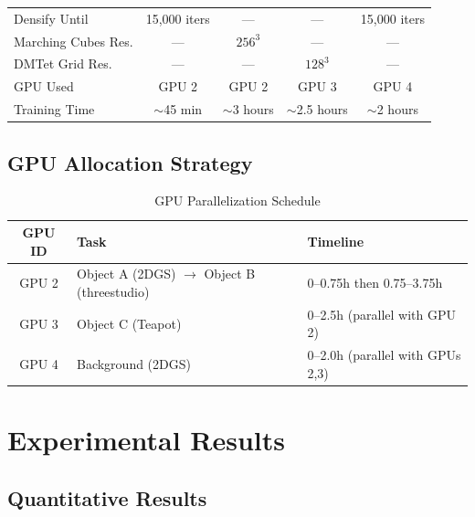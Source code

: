 \documentclass{article}
\begin{document}
\begin{table}[H]
\begin{tabular}{@{}lcccc@{}}
Densify Until       & 15,000 iters          & ---                    & ---                         & 15,000 iters \\
Marching Cubes Res. & ---                   & $256^3$                & ---                         & --- \\
DMTet Grid Res.     & ---                   & ---                    & $128^3$                     & --- \\
GPU Used            & GPU 2                 & GPU 2                  & GPU 3                       & GPU 4 \\
Training Time       & $\sim$45 min          & $\sim$3 hours          & $\sim$2.5 hours             & $\sim$2 hours \\
\bottomrule
\end{tabular}
\end{table}

\subsection{GPU Allocation Strategy}

\begin{table}[H]
\centering
\caption{GPU Parallelization Schedule}
\label{tab:gpu}
\begin{tabular}{@{}cll@{}}
\toprule
\textbf{GPU ID} & \textbf{Task} & \textbf{Timeline} \\
\midrule
GPU 2 & Object A (2DGS) $\rightarrow$ Object B (threestudio) & 0--0.75h then 0.75--3.75h \\
GPU 3 & Object C (Teapot)                                  & 0--2.5h (parallel with GPU 2) \\
GPU 4 & Background (2DGS)                                    & 0--2.0h (parallel with GPUs 2,3) \\
\bottomrule
\end{tabular}
\end{table}

\section{Experimental Results}

\subsection{Quantitative Results}
\end{document}
